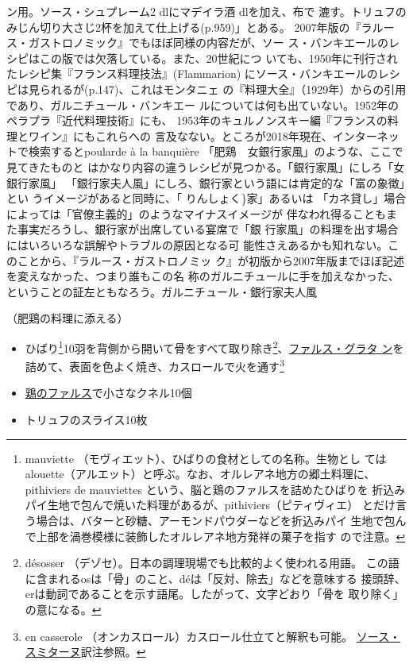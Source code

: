 \begin{recette}
{{{{  ン用。ソース・シュプレーム2 dlにマデイラ酒\undemi{} dlを加え、布で
  漉す。トリュフのみじん切り大さじ2杯を加えて仕上げる(p.959)」とある。
  2007年版の『ラルース・ガストロノミック』でもほぼ同様の内容だが、ソー
  ス・バンキエールのレシピはこの版では欠落している。また、20世紀につ
  いても、1950年に刊行されたレシピ集『フランス料理技法』(Flammarion)
  にソース・バンキエールのレシピは見られるが(p.147)、これはモンタニェ
  の『料理大全』（1929年）からの引用であり、ガルニチュール・バンキエー
  ルについては何も出ていない。1952年のペラプラ『近代料理技術』にも、
  1953年のキュルノンスキー編『フランスの料理とワイン』にもこれらへの
  言及なない。ところが2018年現在、インターネットで検索するとpoularde à
  la banquière 「肥鶏　女銀行家風」のような、ここで見てきたものと
  はかなり内容の違うレシピが見つかる。「銀行家風」にしろ「女銀行家風」
  「銀行家夫人風」にしろ、銀行家という語には肯定的な「富の象徴」とい
  うイメージがあると同時に、「 {りんしょく}\}家」あるいは
  「カネ貸し」場合によっては「官僚主義的」のようなマイナスイメージが
  伴なわれ得ることもまた事実だろうし、銀行家が出席している宴席で「銀
  行家風」の料理を出す場合にはいろいろな誤解やトラブルの原因となる可
  能性さえあるかも知れない。このことから、『ラルース・ガストロノミッ
  ク』が初版から2007年版までほぼ記述を変えなかった、つまり誰もこの名
  称のガルニチュールに手を加えなかった、ということの証左ともなろう。}}{ガルニチュール・銀行家夫人風}}\label{garniture-banquiere}}



（肥鶏の料理に添える）

\begin{itemize}
\item
  ひばり\footnote{mauviette
    （モヴィエット）、ひばりの食材としての名称。生物とし
    てはalouette（アルエット）と呼ぶ。なお、オルレアネ地方の郷土料理に、
    pithiviers de mauviettes という、脳と鶏のファルスを詰めたひばりを
    折込みパイ生地で包んで焼いた料理があるが、pithiviers（ピティヴィエ）
    とだけ言う場合は、バターと砂糖、アーモンドパウダーなどを折込みパイ
    生地で包んで上部を渦巻模様に装飾したオルレアネ地方発祥の菓子を指す
    ので注意。}10羽を背側から開いて骨をすべて取り除き\footnote{désosser
    （デゾセ）。日本の調理現場でも比較的よく使われる用語。
    この語に含まれるosは「骨」のこと、déは「反対、除去」などを意味する
    接頭辞、erは動詞であることを示す語尾。したがって、文字どおり「骨を
    取り除く」の意になる。}、\protect\hyperlink{farce-gratin-c}{ファルス・グラタ
  ン}を詰めて、表面を色よく焼き、カスロールで火を通す\footnote{en
    casserole （オンカスロール）カスロール仕立てと解釈も可能。
    \protect\hyperlink{sauce-smitane}{ソース・スミターヌ}訳注参照。}
\item
  \protect\hyperlink{farce-b}{鶏のファルス}で小さなクネル10個
\item
  トリュフのスライス10枚
\end{itemize}


\end{recette}
